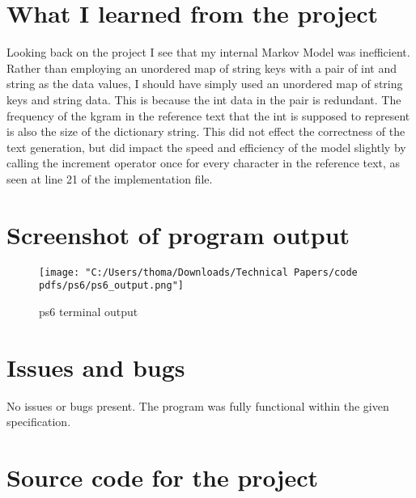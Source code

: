 \documentclass[12pt]{article}
\begin{document}
\section[3]{What I learned from the project}
\hfill\begin{minipage}{\dimexpr\textwidth-1cm}
Looking back on the project I see that my internal Markov Model was inefficient. Rather than employing an unordered map of string keys with a pair of int and string as the data values, I should have simply used an unordered map of string keys and string data. This is because the int data in the pair is redundant. The frequency of the kgram in the reference text that the int is supposed to represent is also the size of the dictionary string. This did not effect the correctness of the text generation, but did impact the speed and efficiency of the model slightly by calling the increment operator once for every character in the reference text, as seen at line 21 of the implementation file.
\end{minipage}

\section[4]{Screenshot of program output}
\begin{figure}[H]
  \centering
  \texttt{[image: "C:/Users/thoma/Downloads/Technical Papers/code pdfs/ps6/ps6\_output.png"]}
  \caption{ps6 terminal output}
  \label{fig:ps6_output}
\end{figure}

\section[5]{Issues and bugs}
\hfill\begin{minipage}{\dimexpr\textwidth-1cm}
No issues or bugs present. \newline
The program was fully functional within the given specification.
\end{minipage}

\section[6]{Source code for the project}
\end{document}
